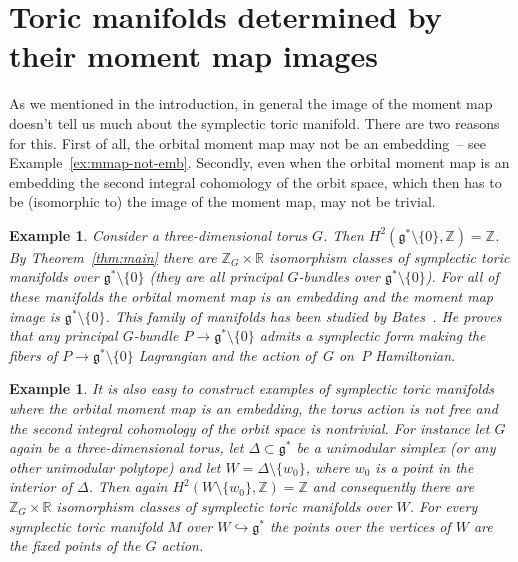 \documentclass[10pt,a4paper]{amsart}
\numberwithin{equation}{section}
\newtheorem{Example}[Lemma]{Example}
\begin{document}
\section{Toric manifolds determined by their moment map images}
\label{sec:the_rest}

As we mentioned in the introduction, in general the image of the
moment map doesn't tell us much about the symplectic toric manifold.
There are two reasons for this. First of all, the orbital moment map
may not be an embedding~-- see Example~\ref{ex:mmap-not-emb}.
Secondly, even when the orbital moment map is an embedding the second
integral cohomology of the orbit space, which then has to be
(isomorphic to) the image of the moment map, may not be trivial.

\begin{Example} Consider a three-dimensional torus $G$.  Then $H^2({\mathfrak g}^*
\setminus \{0\}, {\mathbb Z}) = {\mathbb Z}$.  By Theorem~\ref{thm:main}
there are ${\mathbb Z}_G \times {\mathbb R}$ isomorphism classes of symplectic toric
manifolds over ${\mathfrak g}^* \setminus \{0\}$ (they are all principal
$G$-bundles over ${\mathfrak g}^* \setminus \{0\}$).  For all of these manifolds
the orbital moment map is an embedding and the moment map image is
${\mathfrak g}^*\setminus \{0\}$. This family of manifolds has been studied by
Bates~\cite{Bates}.  He proves that any principal $G$-bundle
$P\to {\mathfrak g}^* \setminus \{0\}$ admits a symplectic form making the f\/ibers of
$P\to {\mathfrak g}^* \setminus \{0\}$ Lagrangian and the action of~$G$ on~$P$ Hamiltonian.
\end{Example}

\begin{Example}
  It is also easy to construct examples of symplectic
  toric manifolds where the orbital moment map is an embedding, the
  torus action is not free and the second integral cohomology of the
  orbit space is nontrivial.  For instance let $G$ again be a three-dimensional torus, let $\Delta \subset {\mathfrak g}^*$ be a unimodular
  simplex (or any other unimodular polytope) and let $W = \Delta
  \setminus \{w_0\}$, where $w_0$ is a point in the interior of
  $\Delta$.  Then again $H^2(W \setminus \{ w_0 \}, {\mathbb Z}) = {\mathbb Z}$ and
  consequently there are ${\mathbb Z}_G \times {\mathbb R}$ isomorphism classes of
  symplectic toric manifolds over $W$.  For every symplectic toric
  manifold $M$ over $W\hookrightarrow {\mathfrak g}^*$ the points over the
  vertices of $W$ are the f\/ixed points of the $G$ action.
\end{Example}
\end{document}
